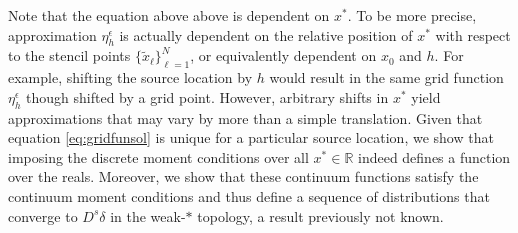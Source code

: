 Note that the equation above above is dependent on $x^*$.
To be more precise, approximation $\eta_h^\epsilon$ is actually dependent on the relative position of $x^*$ with respect to the stencil points $\{\tilde x_\ell\}_{\ell=1}^N$, or equivalently dependent on $x_0$ and $h$.
For example, shifting the source location by $h$ would result in the same grid function $\eta_h^\epsilon$ though shifted by a grid point.
However, arbitrary shifts in $x^*$ yield approximations that may vary by more than a simple translation.
Given that equation \ref{eq:gridfunsol} is unique for a particular source location, we show that imposing the discrete moment conditions over all $x^*\in\mathbb R$ indeed defines a function over the reals.
Moreover, we show that these continuum functions satisfy the continuum moment conditions and thus define a sequence of distributions that converge to $D^{s}\delta$ in the weak-$*$ topology, a result previously not known.

